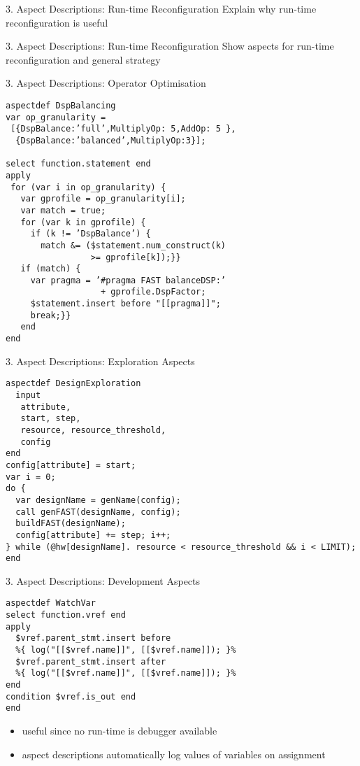 \begin{frame}{3. Aspect Descriptions: Run-time Reconfiguration}
Explain why run-time reconfiguration is useful
\end{frame}

\begin{frame}{3. Aspect Descriptions: Run-time Reconfiguration}
Show aspects for run-time reconfiguration and general strategy
\end{frame}

\begin{frame}[fragile]{3. Aspect Descriptions: Operator Optimisation}
\begin{lstlisting}[label=lst:label, style=lara]
aspectdef DspBalancing
var op_granularity =
 [{DspBalance:’full’,MultiplyOp: 5,AddOp: 5 },
  {DspBalance:’balanced’,MultiplyOp:3}];

select function.statement end
apply
 for (var i in op_granularity) {
   var gprofile = op_granularity[i];
   var match = true;
   for (var k in gprofile) {
     if (k != ’DspBalance’) {
       match &= ($statement.num_construct(k)
                 >= gprofile[k]);}}
   if (match) {
     var pragma = ’#pragma FAST balanceDSP:’
                   + gprofile.DspFactor;
     $statement.insert before "[[pragma]]";
     break;}}
   end
end
\end{lstlisting}
\end{frame}

\begin{frame}[fragile]{3. Aspect Descriptions: Exploration Aspects}
\begin{lstlisting}[label=lst:label, style=lara]
aspectdef DesignExploration
  input
   attribute,
   start, step,
   resource, resource_threshold,
   config
end
config[attribute] = start;
var i = 0;
do {
  var designName = genName(config);
  call genFAST(designName, config);
  buildFAST(designName);
  config[attribute] += step; i++;
} while (@hw[designName]. resource < resource_threshold && i < LIMIT);
end
\end{lstlisting}
\end{frame}

\begin{frame}[fragile]{3. Aspect Descriptions: Development Aspects}
\begin{lstlisting}[label=lst:label, style=lara]
aspectdef WatchVar
select function.vref end
apply
  $vref.parent_stmt.insert before
  %{ log("[[$vref.name]]", [[$vref.name]]); }%
  $vref.parent_stmt.insert after
  %{ log("[[$vref.name]]", [[$vref.name]]); }%
end
condition $vref.is_out end
end
\end{lstlisting}

\begin{itemize}
\item useful since no run-time is debugger available
\item aspect descriptions automatically log values of variables on assignment
\end{itemize}
\end{frame}
